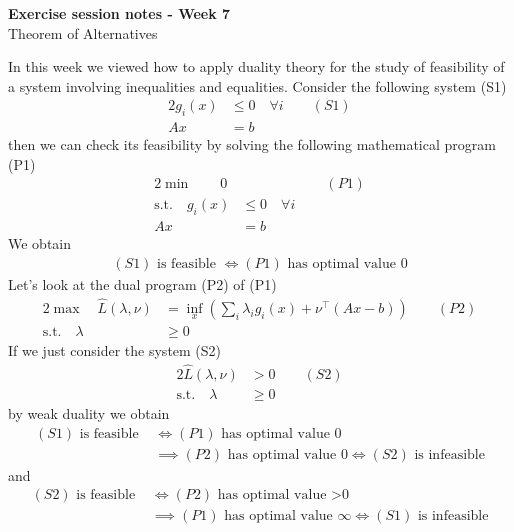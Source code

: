 \documentclass[answers]{exam}
\begin{document}
	$ $
	\begin{center}
		\huge \textbf{Exercise session notes - Week 7}  \\ \vspace*{3mm}
        \Large{Theorem of Alternatives}
	\end{center}
	$ $\\

	In this week we viewed how to apply duality theory for the study of feasibility of a system involving inequalities and equalities. Consider the following system (S1)
	\begin{alignat*}{2}
		g_i(x) &\leq 0 \quad \forall i\qquad (S1) \\ 
		Ax &= b
	\end{alignat*}
	then we can check its feasibility by solving the following mathematical program (P1)
	\begin{alignat*}{2}
		\min \qquad 0& \qquad\qquad\qquad (P1)\\ 
		\text{s.t.}\quad g_i(x) &\leq 0 \quad \forall i \\ 
		Ax &= b
	\end{alignat*}
	We obtain 
	\begin{align*}
		(S1) \text{ is feasible }\iff (P1) \text{ has optimal value 0}
	\end{align*}
	Let's look at the dual program (P2) of (P1)
	\begin{alignat*}{2}
		\max \quad \hat{L}(\lambda, \nu) &= \inf_{x} \left(\sum_i \lambda_i g_i(x) + \nu^\top (Ax - b)\right) \qquad (P2) \\ 
		\text{s.t.}\quad \lambda &\geq 0
	\end{alignat*}
	If we just consider the system (S2)
	\begin{alignat*}{2}
		\hat{L}(\lambda, \nu) &> 0 \qquad (S2) \\ 
		\text{s.t.}\quad \lambda &\geq 0
	\end{alignat*}
	by weak duality we obtain 
	\begin{align*}
		(S1) \text{ is feasible }&\iff (P1) \text{ has optimal value 0} \\
		&\implies (P2) \text{ has optimal value 0} \iff (S2) \text{ is infeasible} 
	\end{align*}
	and 
	\begin{align*}
		(S2) \text{ is feasible }&\iff (P2) \text{ has optimal value >0} \\
		&\implies (P1) \text{ has optimal value }\infty \iff (S1) \text{ is infeasible} 
	\end{align*}
\end{document}
